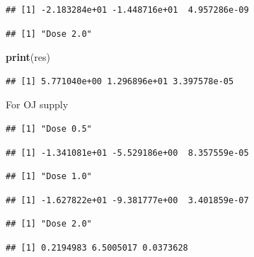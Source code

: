 \documentclass[
]{article}
\newenvironment{Shaded}{\begin{snugshade}}{\end{snugshade}}
\newcommand{\DataTypeTok}[1]{\textcolor[rgb]{0.13,0.29,0.53}{#1}}
\newcommand{\KeywordTok}[1]{\textcolor[rgb]{0.13,0.29,0.53}{\textbf{#1}}}
\newcommand{\NormalTok}[1]{#1}
\newcommand{\OperatorTok}[1]{\textcolor[rgb]{0.81,0.36,0.00}{\textbf{#1}}}
\newcommand{\OtherTok}[1]{\textcolor[rgb]{0.56,0.35,0.01}{#1}}
\newcommand{\StringTok}[1]{\textcolor[rgb]{0.31,0.60,0.02}{#1}}
\begin{document}
\begin{verbatim}
## [1] -2.183284e+01 -1.448716e+01  4.957286e-09
\end{verbatim}

\begin{Shaded}
\end{Shaded}

\begin{verbatim}
## [1] "Dose 2.0"
\end{verbatim}

\begin{Shaded}
\begin{Highlighting}[]
  \KeywordTok{print}\NormalTok{(res)}
\end{Highlighting}
\end{Shaded}

\begin{verbatim}
## [1] 5.771040e+00 1.296896e+01 3.397578e-05
\end{verbatim}

For OJ supply

\begin{verbatim}
## [1] "Dose 0.5"
\end{verbatim}

\begin{verbatim}
## [1] -1.341081e+01 -5.529186e+00  8.357559e-05
\end{verbatim}

\begin{verbatim}
## [1] "Dose 1.0"
\end{verbatim}

\begin{verbatim}
## [1] -1.627822e+01 -9.381777e+00  3.401859e-07
\end{verbatim}

\begin{verbatim}
## [1] "Dose 2.0"
\end{verbatim}

\begin{verbatim}
## [1] 0.2194983 6.5005017 0.0373628
\end{verbatim}
\end{document}
